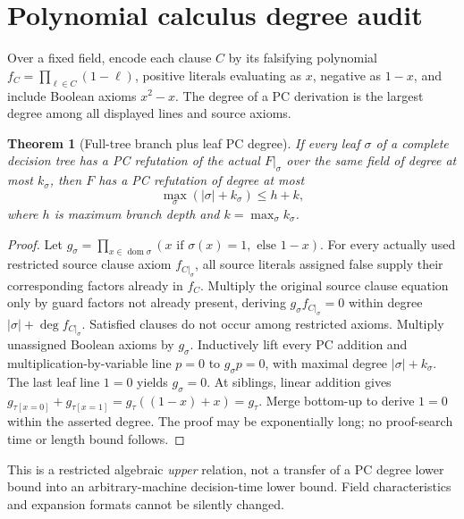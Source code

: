 \documentclass[11pt]{article}
\newtheorem{theorem}{Theorem}
\begin{document}
\section{Polynomial calculus degree audit}
Over a fixed field, encode each clause $C$ by its falsifying
polynomial $f_C=\prod_{\ell\in C}(1-\ell)$, positive literals
evaluating as $x$, negative as $1-x$, and include Boolean
axioms $x^2-x$. The degree of a PC derivation is the largest
degree among all displayed lines and source axioms.
\begin{theorem}[Full-tree branch plus leaf PC degree]
If every leaf $\sigma$ of a complete decision tree has a PC
refutation of the \emph{actual} $F|_\sigma$ over the same
field of degree at most $k_\sigma$, then $F$ has a PC
refutation of degree at most
\[
\max_{\sigma}(|\sigma|+k_\sigma)\le h+k,
\]
where $h$ is maximum branch depth and
$k=\max_\sigma k_\sigma$.
\end{theorem}
\begin{proof}
Let $g_\sigma=\prod_{x\in\operatorname{dom}\sigma}
(x\text{ if }\sigma(x)=1,\text{ else }1-x)$.
For every actually used restricted source clause axiom
$f_{C|_\sigma}$, all source literals assigned false
supply their corresponding factors already in $f_C$.
Multiply the original source clause equation only by
guard factors not already present, deriving
$g_\sigma f_{C|_\sigma}=0$ within degree
$|\sigma|+\deg f_{C|_\sigma}$.
Satisfied clauses do not occur among restricted axioms.
Multiply unassigned Boolean axioms by $g_\sigma$.
Inductively lift every PC addition and multiplication-by-variable
line $p=0$ to $g_\sigma p=0$, with maximal degree
$|\sigma|+k_\sigma$. The last leaf line $1=0$ yields
$g_\sigma=0$. At siblings, linear addition gives
$g_{\tau[x=0]}+g_{\tau[x=1]}
=g_\tau((1-x)+x)=g_\tau$.
Merge bottom-up to derive $1=0$ within the asserted degree.
The proof may be exponentially long; no proof-search time
or length bound follows.
\end{proof}
This is a restricted algebraic \emph{upper} relation, not a
transfer of a PC degree lower bound into an arbitrary-machine
decision-time lower bound. Field characteristics and expansion
formats cannot be silently changed.
\end{document}
